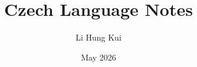 \documentclass[letterpaper,11pt,leqno]{article}
\begin{document}
\title{Czech Language Notes}

\author{Li Hung Kui}

\date{May 2026}   


\begin{titlepage}
\maketitle

\tableofcontents
\end{titlepage}


 

\newpage


% 
\end{document}
